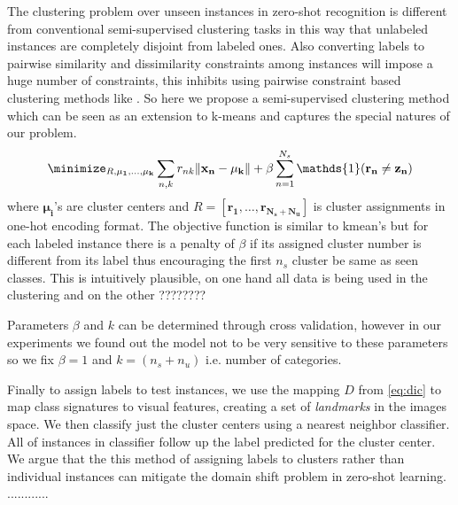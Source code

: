 The clustering problem over unseen instances in zero-shot recognition is
 different from conventional semi-supervised clustering tasks \cite{}
in this way that unlabeled instances are completely disjoint from labeled ones.
Also converting labels to pairwise similarity and dissimilarity constraints among instances will impose
a huge number of constraints, this inhibits using pairwise constraint based clustering methods like \cite{}.
 So here we propose a semi-supervised clustering method which
can be seen as an extension to k-means and captures the special natures of our problem.
\begin{equation}
\minimize_{R, \mathbf{\mu_1, \ldots, \mu_k }}  \sum_{n,k} r_{nk} \lVert \mathbf{x_n - \mu_k} \rVert +
 \beta \sum_{n=1}^{N_s} \mathds{1}(\mathbf{r_n \neq z_n})
\end{equation}
where $\mathbf{\mu_i}$'s are cluster centers and $R = [\mathbf{r_1, \ldots, r_{N_s + N_u }} ]$ is cluster assignments in one-hot encoding format.
The objective function is similar to kmean's but for each labeled instance there is a penalty of $\beta$ if its assigned cluster number is different from its label thus encouraging
the first $n_s$ cluster be same as seen classes. This is intuitively plausible, on one hand all data is being used
in the clustering and on the other ????????

Parameters $\beta$ and $k$ can be determined through cross validation, however in our experiments we found out
the model not to be very sensitive to these parameters so we fix $\beta=1$ and $k =  (n_s + n_u)$ i.e. number of categories.

Finally to assign labels to test instances, we use the mapping $D$ from \eqref{eq:dic} to map class signatures to visual
features, creating a set of \textit{landmarks} in the images space. We then classify just the cluster centers using a
nearest neighbor classifier. All of instances in classifier follow up the label predicted for the cluster center.
We argue that the this method of assigning labels to clusters rather than individual instances can mitigate the
domain shift problem in zero-shot learning.
............

